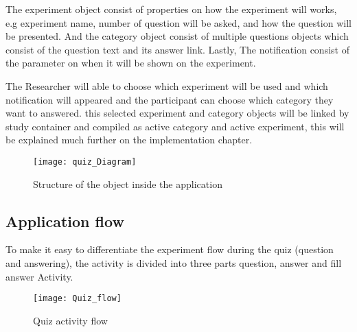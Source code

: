 The experiment object consist of properties on how the experiment will works, e.g experiment name, number of question will be asked, and how the question will be presented.
And the category object consist of multiple questions objects which consist of the question text and its answer link. Lastly, The notification consist of the parameter on when it will be shown on the experiment.

The Researcher will able to choose which experiment will be used and which notification will appeared and the participant can choose which category they want to answered. this selected experiment and category objects will be linked by study container and compiled as active category and active experiment, this will be explained much further on the implementation chapter.

\begin{figure}[!h]
\begin{center}
\texttt{[image: quiz\_Diagram]}
\end{center}
\caption{Structure of the object inside the application}
\label{fig:Experiment_objects}
\end{figure}


\subsection{Application flow}


To make it easy to differentiate the experiment flow during the quiz (question and answering), the activity is divided into three parts question, answer and fill answer Activity.


\begin{figure}[!b]
\begin{center}
\texttt{[image: Quiz\_flow]}
\end{center}
\caption{Quiz activity flow}
\label{fig:quiz_flow}
\end{figure}

